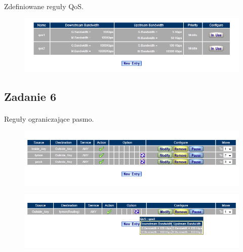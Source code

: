 \documentclass[wide,a4paper,titlepage,12pt] {article}
\begin{document}
  \paragraph{}
  Zdefiniowane reguły QoS.
  \begin{figure}[h!]
    \begin{center}
      \includegraphics[width=\textwidth]{3_5.PNG}
      \caption{}
    \end{center}
  \end{figure}



  \subsection{Zadanie 6}
  \paragraph{}
  Reguły ograniczające pasmo.

  \begin{figure}[h!]
    \begin{center}
      \includegraphics[width=\textwidth]{4.PNG}
    \end{center}
  \end{figure}

  \begin{figure}[h!]
    \begin{center}
      \includegraphics[width=\textwidth]{6.PNG}
    \end{center}
  \end{figure}
\end{document}
